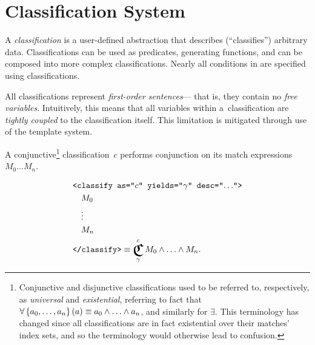 
\section{Classification System}
A \emph{classification} is a user-defined abstraction that describes
  (``classifies'') arbitrary data.
Classifications can be used as predicates, generating functions, and can be
  composed into more complex classifications.
Nearly all conditions in \tame{} are specified using classifications.

All classifications represent \emph{first-order sentences}---%
  that is,
    they contain no \emph{free variables}.
Intuitively,
  this means that all variables within a~classification are
  \emph{tightly coupled} to the classification itself.
This limitation is mitigated through use of the template system.

\begin{definition}
  A conjunctive\footnote{%
    Conjunctive and disjunctive classifications used to be referred to,
      respectively,
      as \emph{universal} and \emph{existential},
        referring to fact that
          $\forall\left\{a_0,\ldots,a_n\right\}(a) \equiv a_0\land\ldots\land a_n$,
            and similarly for $\exists$.
    This terminology has changed since all classifications are in fact
      existential over their matches' index sets,
        and so the terminology would otherwise lead to confusion.
    }
    classification~$c$ performs conjunction on its match expressions
      $M_0\ldots M_n$.

  \begin{align*}
    &\xml{<classify as="$c$" yields="$\gamma$" desc="$\ldots$">} \\
    &\quad M_0 \\
    &\quad \vdots \\
    &\quad M_n \\
    &\xml{</classify>}
      \equiv \Classify^c_\gamma M_0 \land \ldots \land M_n.
  \end{align*}
\end{definition}

